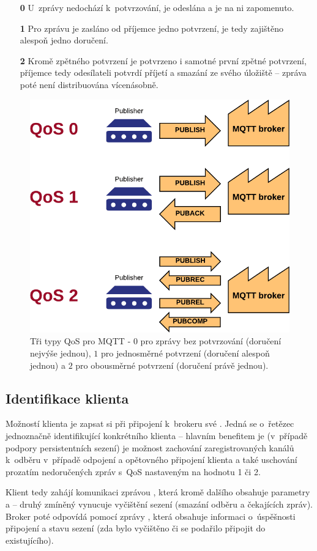 \begin{enumerate}
    \item[\textbf{0}] U~zprávy nedochází k~potvrzování, je odeslána a je na ni zapomenuto.
    \item[\textbf{1}] Pro zprávu je zasláno od příjemce jedno potvrzení, je tedy zajištěno alespoň jedno doručení.
    \item[\textbf{2}] Kromě zpětného potvrzení je potvrzeno i samotné první zpětné potvrzení, příjemce tedy
    odesílateli potvrdí příjetí a smazání ze svého úložiště -- zpráva poté není distribuována vícenásobně.
\end{enumerate}

\begin{figure}
    \centering
    \includegraphics[width=.5\textwidth]{figures/mqtt-qos.png}
    \caption{Tři typy QoS pro MQTT - $0$ pro zprávy bez potvrzování (doručení nejvýše jednou), $1$ pro jednosměrné
    potvrzení (doručení alespoň jednou) a $2$ pro obousměrné potvrzení (doručení právě jednou).}
    \label{fig:mqtt-qos}
\end{figure}

\subsection{Identifikace klienta }\label{subsec:identifikace-klienta-client-id}
Možností klienta je zapsat si při připojení k~brokeru své .
Jedná se o~řetězec jednoznačně identifikující konkrétního klienta -- hlavním benefitem je (v~případě podpory
persistentních sezení) je možnost zachování zaregistrovaných kanálů k~odběru v~případě odpojení a
opětovného připojení klienta a také uschování prozatím nedoručených zpráv s~QoS nastaveným na hodnotu 1 či 2.

Klient tedy zahájí komunikaci zprávou , která kromě dalšího obsahuje parametry  a  -- druhý zmíněný vynucuje vyčištění sezení (smazání odběru a čekajících zpráv).
Broker poté odpovídá pomocí zprávy , která obsahuje informaci o~úspěšnosti připojení a stavu sezení (zda
bylo vyčištěno či se podařilo připojit do existujícího).

